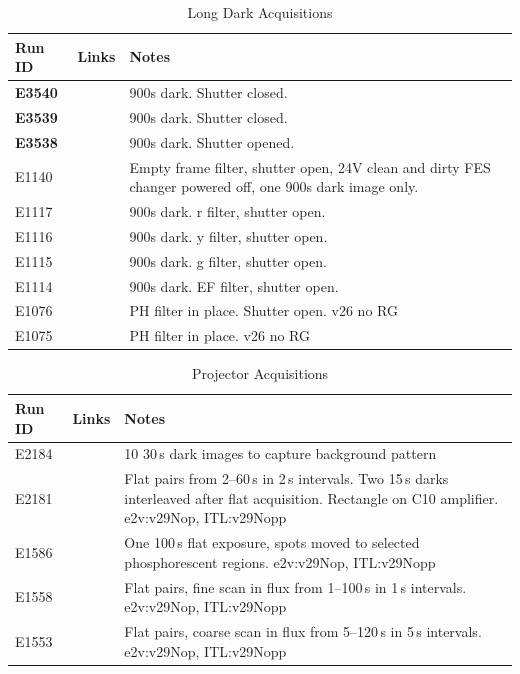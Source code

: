 \begin{table}[ht]\label{table:runs_dark}
\centering
\caption{Long Dark Acquisitions}
\begin{tabular}{|p{1.5cm}|p{2.9cm}|p{9cm}|}
\hline
Run ID & Links & Notes \\ \hline
\textbf{E3540} & & 900s dark. Shutter closed. \\ \hline
\textbf{E3539} & & 900s dark. Shutter closed. \\ \hline
\textbf{E3538} & & 900s dark. Shutter opened. \\ \hline
E1140 & & Empty frame filter, shutter open, 24V clean and dirty FES changer powered off, one 900s dark image only.\\ \hline
E1117 & & 900s dark. r filter, shutter open.\\ \hline
E1116 & & 900s dark. y filter, shutter open.\\ \hline
E1115 & & 900s dark. g filter, shutter open.\\ \hline
E1114 & & 900s dark. EF filter, shutter open.\\ \hline
E1076 & & PH filter in place. Shutter open. v26 no RG\\ \hline
E1075 & & PH filter in place. v26 no RG\\ \hline
\end{tabular}
\end{table}

\begin{table}[ht]\label{table:runs_projector}
\centering
\caption{Projector Acquisitions}
\begin{tabular}{|p{1.5cm}|p{2.9cm}|p{9cm}|}
\hline
Run ID & Links & Notes \\ \hline
E2184 & & 10 30\,s dark images to capture background pattern \\ \hline
E2181 & & Flat pairs from 2--60\,s in 2\,s intervals. Two 15\,s darks interleaved after flat acquisition. Rectangle on C10 amplifier. e2v:v29Nop, ITL:v29Nopp \\ \hline
E1586 & & One 100\,s flat exposure, spots moved to selected phosphorescent regions. e2v:v29Nop, ITL:v29Nopp \\ \hline
E1558 & & Flat pairs, fine scan in flux from 1--100\,s in 1\,s intervals. e2v:v29Nop, ITL:v29Nopp \\ \hline
E1553 & & Flat pairs, coarse scan in flux from 5--120\,s in 5\,s intervals. e2v:v29Nop, ITL:v29Nopp \\ \hline
\end{tabular}
\end{table}

